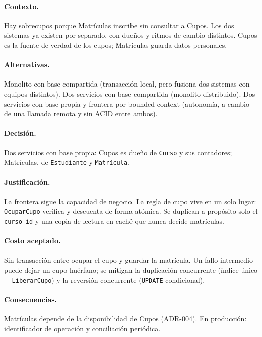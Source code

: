 \documentclass[11pt,spanish]{article}
\begin{document}
\paragraph{Contexto.} Hay sobrecupos porque Matrículas inscribe sin consultar a Cupos. Los dos sistemas ya existen por separado, con dueños y ritmos de cambio distintos. Cupos es la fuente de verdad de los cupos; Matrículas guarda datos personales.

\paragraph{Alternativas.} Monolito con base compartida (transacción local, pero fusiona dos sistemas con equipos distintos). Dos servicios con base compartida (monolito distribuido). Dos servicios con base propia y frontera por bounded context (autonomía, a cambio de una llamada remota y sin ACID entre ambos).

\paragraph{Decisión.} Dos servicios con base propia: Cupos es dueño de \texttt{Curso} y sus contadores; Matrículas, de \texttt{Estudiante} y \texttt{Matrícula}.

\paragraph{Justificación.} La frontera sigue la capacidad de negocio. La regla de cupo vive en un solo lugar: \texttt{OcuparCupo} verifica y descuenta de forma atómica. Se duplican a propósito solo el \texttt{curso\_id} y una copia de lectura en caché que nunca decide matrículas.

\paragraph{Costo aceptado.} Sin transacción entre ocupar el cupo y guardar la matrícula. Un fallo intermedio puede dejar un cupo huérfano; se mitigan la duplicación concurrente (índice único + \texttt{LiberarCupo}) y la reversión concurrente (\texttt{UPDATE} condicional).

\paragraph{Consecuencias.} Matrículas depende de la disponibilidad de Cupos (ADR-004). En producción: identificador de operación y conciliación periódica.
\end{document}
